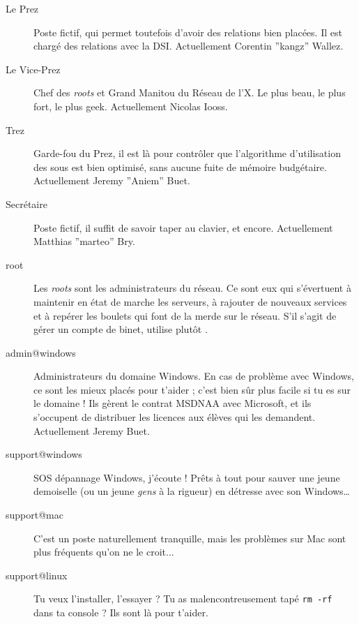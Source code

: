 \begin{description}

  \item[Le Prez]{Poste fictif, qui permet toutefois d'avoir des relations bien plac\'ees. Il est chargé des relations avec la DSI. Actuellement Corentin ''kangz'' Wallez.}
  
  \item[Le Vice-Prez]{Chef des \emph{roots} et Grand Manitou du Réseau de l'X. Le plus beau, le plus fort, le plus geek. Actuellement Nicolas Iooss.}

  \item[Trez]{Garde-fou du Prez, il est là pour contrôler que l'algorithme d'utilisation des sous est bien optimisé, sans aucune fuite de mémoire budgétaire. Actuellement Jeremy ''Aniem'' Buet.}

  \item[Secrétaire]{Poste fictif, il suffit de savoir taper au clavier, et encore. Actuellement Matthias ''marteo'' Bry.}

  \item[root]{Les \emph{roots} sont les administrateurs du r\'eseau. Ce sont eux qui s'\'evertuent \`a maintenir en \'etat de marche les serveurs, \`a rajouter de 
  nouveaux services et \`a rep\'erer les boulets qui font de la merde sur le r\'eseau. S'il s'agit de g\'erer un compte de binet, utilise plut\^ot .}

  \item[admin@windows] {Administrateurs du domaine Windows. En cas de probl\`eme avec Windows, ce sont les mieux plac\'es pour t'aider ;
  c'est bien s\^ur  plus facile si tu es sur le domaine ! Ils gèrent le contrat
  MSDNAA avec Microsoft, et ils s'occupent de distribuer les licences aux élèves qui les demandent. Actuellement Jeremy Buet.}
  
  \item[support@windows] {SOS d\'epannage Windows, j'\'ecoute ! Pr\^ets \`a tout pour sauver une jeune demoiselle (ou un jeune \emph{gens} \`a la rigueur) en d\'etresse avec son Windows\dots }

  \item[support@mac] {C'est un poste naturellement tranquille, mais les problèmes sur Mac sont plus fréquents qu'on ne le croit... }
  
  \item[support@linux] {Tu veux l'installer, l'essayer ? Tu as malencontreusement tapé \texttt{rm -rf \/} dans ta console ? Ils sont là pour t'aider.}
  

\end{description}
